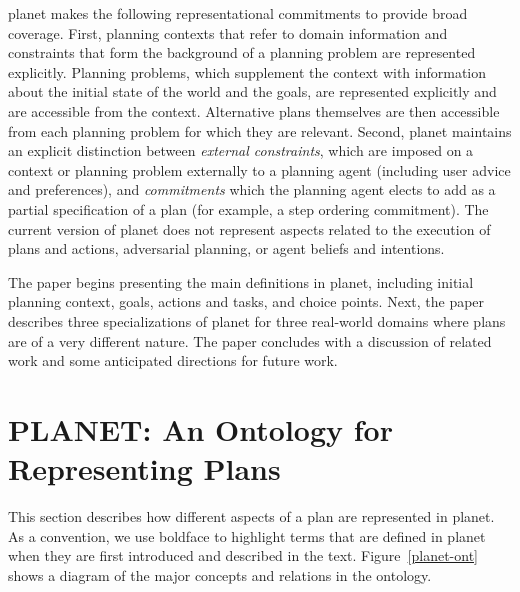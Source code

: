 {\sc planet} makes the following representational commitments to provide broad
coverage.  First, planning contexts that refer to domain information and
constraints that form the background of a planning problem are represented
explicitly. Planning problems, which supplement the context with
information about the initial state of the world and the goals, are
represented explicitly and are accessible from the context. Alternative
plans themselves are then accessible from each planning problem for which
they are relevant.
Second, {\sc planet} maintains an explicit distinction between {\em
external constraints}, which are imposed on a context or planning problem
externally to a planning agent (including 
user advice and preferences), and {\em commitments} which 
the planning agent elects to add as a partial specification of a plan
(for example, a step ordering commitment).
The current version of {\sc planet} does not represent aspects related to
the execution of plans and actions, adversarial planning, 
or agent beliefs and intentions.

The paper begins presenting the main definitions in
{\sc planet}, including initial planning context, goals, 
actions and tasks, and choice points.  
Next, the paper describes three specializations of {\sc planet} 
for three real-world domains where plans are of a very different nature.  
The paper concludes with a discussion of related work and 
some anticipated directions for future work.





\section{PLANET: An Ontology for Representing Plans}

This section describes how different aspects of a plan are 
represented in {\sc planet}.  
As a convention, we use boldface to highlight terms 
that are defined in {\sc planet} when they are first introduced 
and described in the text.
Figure~\ref{planet-ont} shows a diagram of the major
concepts and relations in the ontology.


